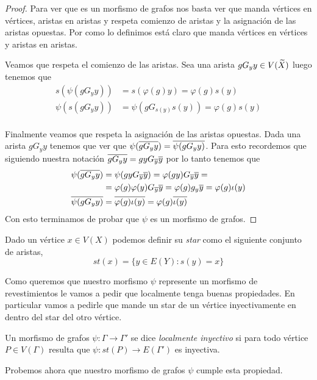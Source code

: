 \documentclass[tesis.tex]{subfiles}
\begin{document}
\begin{proof}
Para ver que es un morfismo de grafos nos basta ver que manda vértices en vértices, aristas en aristas y respeta comienzo de aristas y la asignación de las aristas opuestas.
Por como lo definimos está claro que manda vértices en vértices y aristas en aristas.

Veamos que respeta el comienzo de las aristas.
Sea una arista $gG_y y \in V(\widetilde X)$ luego tenemos que 
\begin{align*}
s(\psi(gG_y y )) &= s (\varphi(g)  y) =  \varphi(g) s(y) 	\\ 
\psi(s(gG_y y))  &= \psi(gG_{s(y)} s(y)) = \varphi(g){s(y)} \\
\end{align*}	

Finalmente veamos que respeta la asignación de las aristas opuestas.	
Dada una arista $g G_y y$ tenemos que ver que $\psi(\overline{g G_y y}) = \overline{\psi(g G_y y)}$.	
Para esto recordemos que siguiendo nuestra notación $\overline{g G_y y} = gyG_{\overline y} \overline y $ por lo tanto tenemos que 
\begin{align*}
\psi(\overline{gG_y y }) &= \psi(gyG_{\overline y} \overline y) = \varphi(gy) G_{\overline y} \overline y =         \\ 
&= \varphi(g)\varphi(y) G_{\overline y} \overline y = \varphi(g) g_y \overline y = \varphi(g) \iota(y) \\
\overline{\psi(gG_y y)} &= \overline{ \varphi(g) \iota(y) } = \varphi(g) \overline{ \iota(y)} 
\end{align*}
Con esto terminamos de probar que $\psi$ es un morfismo de grafos.
\end{proof}


Dado un vértice $x \in V(X)$ podemos definir su \emph{star} como el siguiente conjunto de aristas,
\[
	st(x) = \{  y \in E(Y) : s(y) = x  \}
\]

Como queremos que nuestro morfismo $\psi$ represente un morfismo de revestimientos le vamos a pedir que localmente tenga buenas propiedades. 
En particular vamos a pedirle que mande un star de un vértice inyectivamente en dentro del star del otro vértice.

\begin{deff}
	Un morfismo de grafos $\psi:\Gamma \to \Gamma'$ se dice \emph{localmente inyectivo} si para todo vértice $P \in V(\Gamma)$ resulta que $\psi: st(P) \to E(\Gamma')$ es inyectiva. 
\end{deff}

Probemos ahora que nuestro morfismo de grafos $\psi$ cumple esta propiedad.
\end{document}
